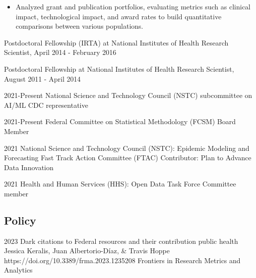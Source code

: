 \documentclass[]{scrartcl}
\begin{document}
\begin{cleanCV}
{\begin{itemize}
  \item Analyzed grant and publication portfolios, evaluating metrics such as clinical impact, technological impact, and award rates to build quantitative comparisons between various populations.
    
  \end{itemize}
}

\vspace{0.5em}
 
\WorkExperience
{}
{Postdoctoral Fellowship (IRTA) at National Institutes of Health}
{\newline Research Scientist, April 2014 - February 2016}
{}{}


\WorkExperience
{}
{Postdoctoral Fellowship at National Institutes of Health}
{\newline Research Scientist, August 2011 - April 2014}




\WorkExperienceX
{2021-Present}
{National Science and Technology Council (NSTC) subcommittee on AI/ML}
{CDC representative}

\WorkExperienceX
{2021-Present}
{Federal Committee on Statistical Methodology (FCSM)}
{Board Member}

\WorkExperienceX
{2021}
{National Science and Technology Council (NSTC): Epidemic Modeling and Forecasting Fast Track Action Committee (FTAC)}
{Contributor: Plan to Advance Data Innovation}

\WorkExperienceX
{2021}
{Health and Human Services (HHS): Open Data Task Force}
{Committee member}




\vspace{-1em}

\subsection{Policy}

\Paper
{2023}
{Dark citations to Federal resources and their contribution public health}
{Jessica Keralis, Juan Albertorio-Díaz, \& Travis Hoppe}
{https://doi.org/10.3389/frma.2023.1235208}
{Frontiers in Research Metrics and Analytics}


\end{cleanCV}
\end{document}

